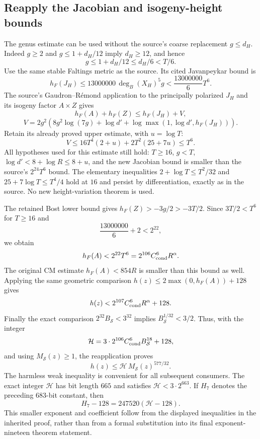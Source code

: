 \subsection{Reapply the Jacobian and isogeny-height bounds}

The genus estimate can be used without the source's coarse replacement
$g\le d_H$. Indeed $g\ge2$ and $g\le1+d_H/12$ imply $d_H\ge12$,
and hence
\[
 g\le1+d_H/12\le d_H/6<T/6.
\]
Use the same stable Faltings metric as the source. Its cited
Javanpeykar bound is
\[
 h_F(J_H)\le13000000\,\deg_B(X_H)^5g
       <\frac{13000000}{6}T^6.
\]
The source's Gaudron--R\'emond application to the principally polarized
$J_H$ and its isogeny factor $A\times Z$ gives
\[
 h_F(A)+h_F(Z)\le h_F(J_H)+V,
\]
\[
 V=2g^2\left(8g^2\log(7g)+\log d'
        +\log\max(1,\log d',h_F(J_H))\right).
\]
Retain its already proved upper estimate, with $u=\log T$:
\[
 V\le16T^4(2+u)+2T^2(25+7u)\le T^6.
\]
All hypotheses used for this estimate still hold: $T\ge16$,
$g<T$, $\log d'<8+\log R\le8+u$, and the new Jacobian bound is
smaller than the source's $2^{24}T^6$ bound. The elementary inequalities
$2+\log T\le T^2/32$ and $25+7\log T\le T^4/4$ hold at $16$
and persist by differentiation, exactly as in the source. No new
height-variation theorem is used.

The retained Bost lower bound gives $h_F(Z)>-3g/2>-3T/2$. Since
$3T/2<T^6$ for $T\ge16$ and
\[
 \frac{13000000}{6}+2<2^{22},
\]
we obtain
\[
 h_F(A)<2^{22}T^6
       =2^{106}C_{\rm cond}^6R^{\alpha}.
\]
The original CM estimate $h_F(A)<854R$ is smaller than this bound
as well. Applying the same geometric comparison
$h(z)\le2\max(0,h_F(A))+128$ gives
\[
 h(z)<2^{107}C_{\rm cond}^6R^{\alpha}+128.
\]
Finally the exact comparison
$2^{32}B_{\mathcal S}<3^{32}$ implies
$B_{\mathcal S}^{1/32}<3/2$. Thus, with the integer
\begin{equation}\label{r8:height-constant}
 \mathcal H=3\cdot2^{106}C_{\rm cond}^6B_{\mathcal S}^{18}+128,
\end{equation}
and using $M_{\mathcal S}(z)\ge1$, the reapplication proves
\begin{equation}\label{r8:height}
 \boxed{h(z)\le\mathcal H\,M_{\mathcal S}(z)^{577/32}.}
\end{equation}
The harmless weak inequality is convenient for all subsequent consumers.
The exact integer $\mathcal H$ has bit length $665$ and satisfies
$\mathcal H<3\cdot2^{663}$. If $H_7$ denotes the preceding
683-bit constant, then
\[
 H_7-128=247520(\mathcal H-128).
\]
This smaller exponent and coefficient follow from the displayed
inequalities in the inherited proof, rather than from a formal
substitution into its final exponent-nineteen theorem statement.

